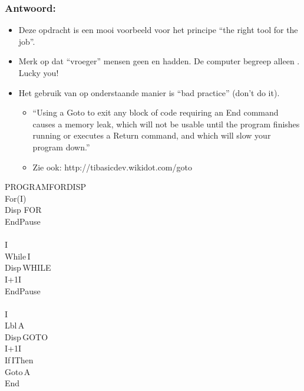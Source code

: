 \begin{frame}
\frametitle{Antwoord: }

\begin{minipage}{0.68\textwidth}
\begin{itemize}
  \item Deze opdracht is een mooi voorbeeld voor het principe ``the right tool for the job''.
  \item Merk op dat ``vroeger'' mensen geen  en  hadden. De computer begreep alleen . Lucky you!
  \item Het gebruik van  op onderstaande manier is ``bad practice'' (don't do it).
  \begin{itemize}
    \item ``Using a Goto to exit any block of code requiring an End command causes a memory leak,
    	which will not be usable until the program finishes running or executes a Return command, and which will slow your program down.''
    \item \tiny{Zie ook: http://tibasicdev.wikidot.com/goto}
  \end{itemize}
\end{itemize}
\end{minipage}
\begin{minipage}{0.3\textwidth}
\begin{ticalc}
	PROGRAM\:FORDISP\\%
	\:For(I)\\%
	\:Disp \qt FOR\qt\\%
	\:End\:Pause\\%
	\:\\%
	\>I\\%
	\:While\,I\\%
	\:Disp\,\qt WHILE\qt\\%
	\:I+1\>I\\%
	\:End\:Pause\\%
	\:\\%
	\>I\\%
	\:Lbl\,A\\%
	\:Disp\,\qt GOTO\qt\\%
	\:I+1\>I\\%
	\:If\,I\:Then\\%
	\:Goto\,A\\%
	\:End	
\end{ticalc}
\end{minipage}

\end{frame}



